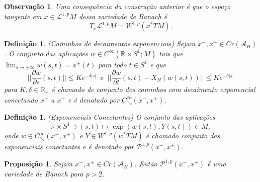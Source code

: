 \documentclass[12pt]{book}
\newtheorem{definicao}[teorema]{Definição}
\newtheorem{observacao}[teorema]{Observação}
\newtheorem{proposicao}[teorema]{Proposição}
\newcommand{\aplicaoessuavesreatacirculo}{C^{\infty}(\retacartesianocirculo; M)}
\newcommand{\caminhosdecaimentoexponencial}[2]{C^{\infty}_{\searrow}(#1, #2)}
\newcommand{\caminhosdecaimentoexponencialpadrao}{\caminhosdecaimentoexponencial{x^{-}}{x^{+}}}
\newcommand{\caminhosexponenciaisconectantes}[2]{\mathcal{P}^{1,p}(#1, #2)}
\newcommand{\caminhosexponenciaisSobolev}{\mathcal{L}^{1,p}M}
\newcommand{\caminhosexponenciaisconectantespadrao}{\caminhosexponenciaisconectantes{x^{-}}{x^{+}}}
\newcommand{\circulo}{S^{1}}
\newcommand{\derivadaparcial}[2]{\frac{\partial #1}{\partial #2}}
\newcommand{\espacosobolev}[1]{W^{1,p}(#1)}
\newcommand{\espacotangenteponto}[2]{T_{#1}#2}
\newcommand{\funcionalH}{\mathcal{A}_{H}}
\newcommand{\normagrande}[1]{\Big|\Big|#1\Big|\Big|}
\newcommand{\pontoscriticos}[1]{\textit{Cr}(#1)}
\newcommand{\pullbackfibradotangente}[2]{#1^{*}T#2}
\newcommand{\pullbackfibradotangenteM}[1]{\pullbackfibradotangente{#1}{M}}
\newcommand{\retacartesianocirculo}{\real{} \times \circulo}
\newcommand{\real}[1]{\mathbb{R}^{#1}}
\newcommand{\reta}{\real{}}
\begin{document}
	\begin{observacao}
		Uma consequência da construção anterior é que o espaço tangente em $x\in \caminhosexponenciaisSobolev$ dessa variedade de Banach é
		$$
		\espacotangenteponto{x}{\caminhosexponenciaisSobolev} = \espacosobolev{\pullbackfibradotangenteM{x}}.
		$$
	\end{observacao}
	
	\begin{definicao}\label{definicao_caminhos_decaimentos_exponenciais}
		(Caminhos de decaimentos exponenciais) Sejam $x^{-}, x^{+} \in \pontoscriticos{\funcionalH}$. O conjunto das aplicações $w \in \aplicaoessuavesreatacirculo$ tais que $\lim_{s \to \pm \infty} w(s,t) = x^{\pm}(t)$ para todo  $t\in \circulo $ e que 
		$$
		\normagrande{\derivadaparcial{w}{s}(s,t)} \leq Ke^{-\delta|s|} \;\; \text{e} \;\; \normagrande{\derivadaparcial{w}{t}(s,t) -X_{H}(w(s,t))} \leq Ke^{-\delta|s|}
		$$
		para $K,\delta \in \reta_{+}$ é chamado de conjunto dos caminhos com decaimento exponencial conectando $x^{-}$ a $x^{+}$ e é denotado por $\caminhosdecaimentoexponencialpadrao$.
	\end{definicao}
	
	\begin{definicao}
		(Exponenciais Conectantes) O conjunto das aplicações 
		$$
		\retacartesianocirculo \ni (s,t) \mapsto \exp(w(s,t), Y(s,t)) \in M,
		$$
		onde $w \in \caminhosdecaimentoexponencialpadrao$ e $Y\in \espacosobolev{\pullbackfibradotangenteM{w}}$ é chamado conjunto das exponenciais conectantes e é denotado por $\caminhosexponenciaisconectantespadrao$.
	\end{definicao}
	
	\begin{proposicao}\label{proposicao_variedade_banach}
		Sejam $x^{-}, x^{+} \in \pontoscriticos{\funcionalH}$. Então $\caminhosexponenciaisconectantespadrao$ é uma variedade de Banach para $p>2$.
	\end{proposicao}
	
\end{document}
